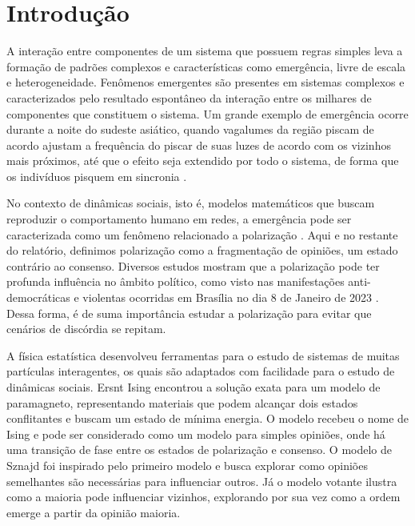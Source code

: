 \tableofcontents

\section{Introdução}\label{introduuxe7uxe3o}

A interação entre componentes de um sistema que possuem regras simples
leva a formação de padrões complexos e características como emergência,
livre de escala e heterogeneidade. Fenômenos emergentes são presentes em
sistemas complexos e caracterizados pelo resultado espontâneo da
interação entre os milhares de componentes que constituem o sistema. Um
grande exemplo de emergência ocorre durante a noite do sudeste asiático,
quando vagalumes da região piscam de acordo ajustam a frequência do
piscar de suas luzes de acordo com os vizinhos mais próximos, até que o
efeito seja extendido por todo o sistema, de forma que os indivíduos
pisquem em sincronia \cite{johnson2002emergence}.

No contexto de dinâmicas sociais, isto é, modelos matemáticos que buscam
reproduzir o comportamento humano em redes, a emergência pode ser
caracterizada como um fenômeno relacionado a polarização
\cite{maia2021emergence}. Aqui e no restante do relatório, definimos
polarização como a fragmentação de opiniões, um estado contrário ao
consenso. Diversos estudos mostram que a polarização pode ter profunda
influência no âmbito político, como visto nas manifestações
anti-democráticas e violentas ocorridas em Brasília no dia 8 de Janeiro
de 2023 \cite{interian2023polarization,layton2021polarization}. Dessa
forma, é de suma importância estudar a polarização para evitar que
cenários de discórdia se repitam.

A física estatística desenvolveu ferramentas para o estudo de sistemas
de muitas partículas interagentes, os quais são adaptados com facilidade
para o estudo de dinâmicas sociais. Ersnt Ising encontrou a solução
exata para um modelo de paramagneto, representando materiais que podem
alcançar dois estados conflitantes e buscam um estado de mínima energia.
O modelo recebeu o nome de Ising e pode ser considerado como um modelo
para simples opiniões, onde há uma transição de fase entre os estados de
polarização e consenso. O modelo de Sznajd foi inspirado pelo primeiro
modelo e busca explorar como opiniões semelhantes são necessárias para
influenciar outros. Já o modelo votante ilustra como a maioria pode
influenciar vizinhos, explorando por sua vez como a ordem emerge a
partir da opinião maioria.

